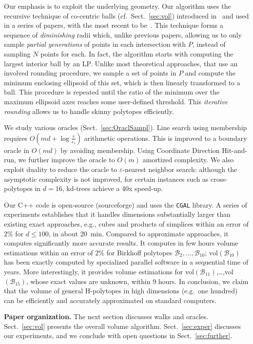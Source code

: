 \documentclass[11pt,a4paper]{article}
\def\B{{\mathcal B}} \def\E{{\mathcal E}}
\def\vol{\mbox{vol}}
\def\vol{\mbox{vol}}
\begin{document}
Our emphasis is to exploit the underlying geometry.
Our algorithm uses the recursive technique of co-centric balls (cf.\ Sect.~\ref{sec:vol}) introduced in~\cite{DyerFrKa91} and used in a series of papers, with the most recent to be~\cite{KannanLS97}.  
This technique forms a sequence of {\em diminishing} radii
which, unlike previous papers, allowing us to only sample {\em partial generations} of points in each intersection with $P$, instead of sampling $N$ points for each.
In fact, the algorithm starts with computing the largest interior ball by an LP.
Unlike most theoretical approaches, that use an involved rounding procedure,
we sample a set of points in $P$ and compute the minimum enclosing ellipsoid of this set, which is then linearly transformed to a ball. This procedure  is repeated until the ratio of the minimum over the maximum ellipsoid axes reaches some user-defined threshold. This {\em iterative rounding} allows us to handle skinny polytopes efficiently.

We study various oracles (Sect.~\ref{sec:OraclSampl}). 
Line search using membership requires
$O(md + \log \frac{r}{\epsilon_s})$ arithmetic operations.
This is improved to a boundary oracle in $O(md)$ by avoiding membership. 
Using Coordinate Direction Hit-and-run, we further improve 
the oracle to $O(m)$ amortized complexity.
We also exploit duality to reduce the oracle to
$\varepsilon$-nearest neighbor search:
although the asymptotic complexity is not improved,
for certain instances such as cross-polytopes in $d=16$,
kd-trees achieve a 40x speed-up. 

Our C++ code is
open-source (sourceforge) and uses the {\tt CGAL} library. A series of experiments establishes that
it handles dimensions substantially larger than existing exact approaches,
e.g., cubes and products of simplices
within an error of $2\%$ for $d\le 100$, in about 20~min.
Compared to approximate approaches, it computes significantly
more accurate results.
It computes in few hours volume estimations within an error of $2\%$ for Birkhoff polytopes $\B_{2},\dots,\B_{10}$; $\vol(\B_{10})$ has been exactly computed by specialized parallel software in a sequential time of years.   
More interestingly, it provides volume estimations for \vol$(\B_{11})$,\dots,\vol$(\B_{15})$, whose exact values are unknown, within 9 hours.  
In conclusion, we claim that the volume of general H-polytopes
in high dimensions (e.g.\ one hundred) can be efficiently and accurately
approximated on standard computers.  

\textbf{Paper organization.}
The next section discusses walks and oracles.
Sect.~\ref{sec:vol} presents the overall volume algorithm.  
Sect.~\ref{sec:exper} discusses our experiments, and we conclude
with open questions in Sect.~\ref{sec:further}.
\end{document}
